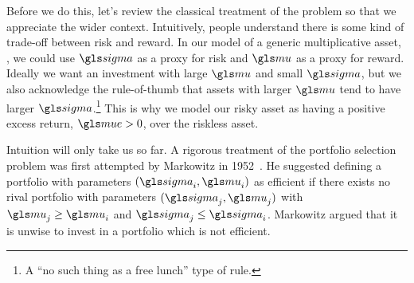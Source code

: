 Before we do this, let's review the classical treatment of the problem so that we appreciate the wider context. Intuitively, people understand there is some kind of trade-off between risk and reward. In our model of a generic multiplicative asset, , we could use $\gsigma$ as a proxy for risk and $\gmu$ as a proxy for reward. Ideally we want an investment with large $\gmu$ and small $\gsigma$, but we also acknowledge the rule-of-thumb that assets with larger $\gmu$ tend to have larger $\gsigma$.\footnote{A ``no such thing as a free lunch'' type of rule.} This is why we model our risky asset as having a positive excess return, $\mue>0$, over the riskless asset.

Intuition will only take us so far. A rigorous treatment of the portfolio selection problem was first attempted by Markowitz in 1952~\cite{Markowitz1952}. He suggested defining a portfolio with parameters $(\gsigma_i, \gmu_i)$ as efficient if there exists no rival portfolio with parameters $(\gsigma_j, \gmu_j)$ with $\gmu_j\geq\gmu_i$ and $\gsigma_j\leq\gsigma_i$.
Markowitz argued that it is unwise to invest in a portfolio which is not efficient.

